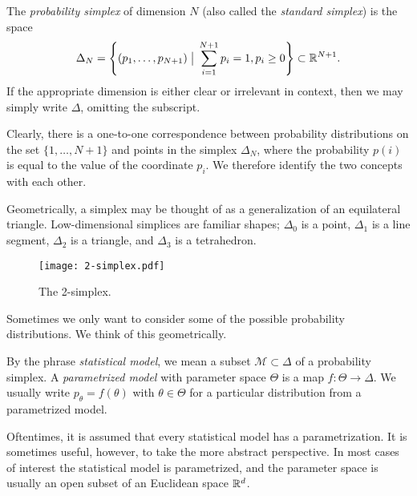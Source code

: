 \documentclass[cclicense]{hmcthesis}
\newcommand*{\Mod}{\mathcal{M}}
\newcommand*{\vbar}{\;\big\vert\;}
\numberwithin{equation}{chapter}
\numberwithin{thmcounter}{chapter}
\begin{document}
    \begin{definition} 
        The \emph{probability simplex} of dimension $N$ (also
        called the \emph{standard simplex}) is the space
        \[
            \Delta_N = 
            \left\{(p_1, \ldots, p_{N+1}) \vbar \sum_{i=1}^{N+1} p_i= 1, p_i \ge 0 \right\} 
            \subset
            \R^{N+1}.
        \]
        If the appropriate dimension is either clear or irrelevant in context,
        then we may simply write $\Delta$, omitting the subscript.
    \end{definition}

    Clearly, there is a one-to-one correspondence between probability
    distributions on the set $\{1, \ldots, N+1\}$ and points in the simplex
    $\Delta_N$, where the probability $p(i)$ is equal to the value of the
    coordinate $p_i$.  We therefore identify the two concepts with each other.

    Geometrically, a simplex may be thought of as a generalization of an
    equilateral triangle.  Low-dimensional simplices are familiar shapes;
    $\Delta_0$ is a point, $\Delta_1$ is a line segment, $\Delta_2$ is a
    triangle, and $\Delta_3$ is a tetrahedron.
    \begin{figure}[H]
        \centering
        \texttt{[image: 2-simplex.pdf]}
        \caption{The 2-simplex.}
    \end{figure}
    
    Sometimes we only want to consider some of the possible probability
    distributions.  We think of this geometrically.
    \begin{definition}
    By the phrase \emph{statistical model}, we mean a subset $\Mod \subset
    \Delta$ of a probability simplex.  A \emph{parametrized model} with
    parameter space $\Theta$ is a map $f: \Theta \to \Delta$.  We usually write
    $p_\theta = f(\theta)$ with $\theta \in \Theta$ for a particular
    distribution from a parametrized model.
    \end{definition}

    Oftentimes, it is assumed that every statistical model has a
    parametrization.  It is sometimes useful, however, to take the more abstract
    perspective.  In most cases of interest the statistical model is 
    parametrized, and the parameter space is usually an open subset of an
    Euclidean space $\mathbb{R}^d$.
\end{document}
